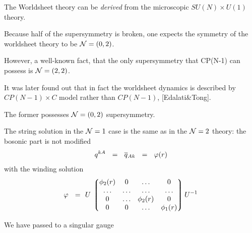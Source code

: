 \documentclass[12pt,letterpaper,landscape,KOMA,smallheadings,calcdimensions,display]{powersem}
\newcommand{\sunu}{SU(N) \times U(1)}
\begin{document}
\begin{slide}
	
	The Worldsheet theory can be \emph{derived} from the microscopic $\sunu$ theory.

	Because half of the supersymmetry is broken, one expects the symmetry of the worldsheet
	theory to be $ \mathcal{N}=(0,2) $.

	However, a well-known fact, that the only supersymmetry that CP(N-1) can possess
	is $ \mathcal{N}=(2,2) $.

	It was later found out that in fact the worldsheet dynamics is described by 
	$ CP(N-1) \times C $ model rather than $ CP(N-1) $, [Edalati\&Tong].

	The former possesses $ \mathcal{N}=(0,2) $ supersymmetry.
	
\end{slide}

\begin{slide}

	The string solution in the $ \mathcal{N}=1 $ case is the same as in the $ \mathcal{N}=2 $
	theory:  the bosonic part is not modified
\[
	q^{kA}  ~~=~~ \overline{q}{}_{Ak} ~~=~~ \varphi(r)
\]
	with the winding solution
\begin{align*}
%
	\varphi ~~=~~ & U\, \lgr \begin{matrix}
			   	\phi_2(r)  & 0  & \ldots & 0 \\
				\ldots  &  \ldots & \ldots & \ldots \\
				0  & \ldots      & \phi_2(r) &  0 \\
				0  & 0           & \ldots  &  \phi_1(r) 
			   \end{matrix}        \rgr     
			U^{-1} \\
\end{align*}

	We have passed to a singular gauge

\end{slide}
\end{document}
